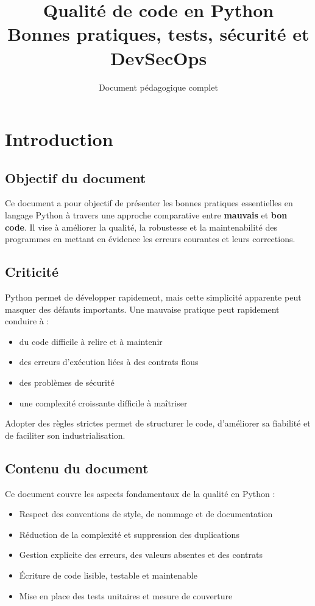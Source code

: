\documentclass[a4paper,11pt]{report}
\title{\textbf{Qualité de code en Python}\\
Bonnes pratiques, tests, sécurité et DevSecOps}
\author{Document pédagogique complet}
\begin{document}
\maketitle
\tableofcontents
\newpage

\chapter{Introduction}

\section{Objectif du document}

Ce document a pour objectif de présenter les bonnes pratiques essentielles en langage Python à travers une approche comparative entre \textbf{mauvais} et \textbf{bon code}. Il vise à améliorer la qualité, la robustesse et la maintenabilité des programmes en mettant en évidence les erreurs courantes et leurs corrections.

\section{Criticité}

Python permet de développer rapidement, mais cette simplicité apparente peut masquer des défauts importants. Une mauvaise pratique peut rapidement conduire à :
\begin{itemize}
  \item du code difficile à relire et à maintenir
  \item des erreurs d'exécution liées à des contrats flous
  \item des problèmes de sécurité
  \item une complexité croissante difficile à maîtriser
\end{itemize}

Adopter des règles strictes permet de structurer le code, d'améliorer sa fiabilité et de faciliter son industrialisation.

\section{Contenu du document}

Ce document couvre les aspects fondamentaux de la qualité en Python :
\begin{itemize}
  \item Respect des conventions de style, de nommage et de documentation
  \item Réduction de la complexité et suppression des duplications
  \item Gestion explicite des erreurs, des valeurs absentes et des contrats
  \item Écriture de code lisible, testable et maintenable
  \item Mise en place des tests unitaires et mesure de couverture
\end{itemize}
\end{document}
